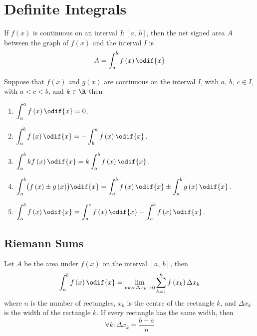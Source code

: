 \documentclass{article}
\begin{document}
\section{Definite Integrals}
\begin{theorem}
    If \(f\left( x \right)\) is continuous on an interval \(I:\left[ a,\:b \right]\),
    then the net signed area \(A\) between the graph of \(f\left( x \right)\) and the
    interval \(I\) is
    \begin{equation*}
        A = \int_a^b f\left( x \right) \odif{x}
    \end{equation*}
\end{theorem}
\begin{tcolorboxlarge}[title={Properties of Definite Integrals}]
    \begin{theorem}
        Suppose that \(f\left( x \right)\) and \(g\left( x \right)\) are continuous on the
        interval \(I\), with \(a,\:b,\:c\in I\), with \(a < c < b\), and
        \(k\in\R\) then
        \begin{enumerate}[label=\normalfont\alph*)]
            \item \(\displaystyle\int_a^a f\left( x \right) \odif{x} = 0\).
            \item \(\displaystyle\int_a^b f\left( x \right) \odif{x} = -\int_b^a f\left( x \right) \odif{x}\).
            \item \(\displaystyle\int_a^b kf\left( x \right) \odif{x} = k\int_a^b f\left( x \right) \odif{x}\).
            \item \(\displaystyle\int_a^b \bigl(f\left( x \right) \pm g\left( x \right)\bigr) \odif{x} = \int_a^b f\left( x \right) \odif{x} \pm \int_a^b g\left( x \right) \odif{x}\).
            \item \(\displaystyle\int_a^b f\left( x \right) \odif{x} = \int_a^c f\left( x \right) \odif{x} + \int_c^b f\left( x \right) \odif{x}\).
        \end{enumerate}
    \end{theorem}
\end{tcolorboxlarge}
\subsection{Riemann Sums}
\begin{theorem}
    \label{theorem:1d_riemann_sums}
    Let \(A\) be the area under \(f\left( x \right)\) on the interval
    \(\left[ a,\:b \right]\), then
    \begin{equation*}
        \int_a^b f\left( x \right) \odif{x} = \lim_{\max{\Delta x_k}\to 0} \sum_{k=1}^n f\left( x_k \right) \Delta x_k
    \end{equation*}
    where \(n\) is the number of rectangles, \(x_k\) is the centre of
    the rectangle \(k\), and \(\Delta x_k\) is the width of the
    rectangle \(k\). If every rectangle has the same width, then
    \begin{equation*}
        \forall k:\Delta x_k = \frac{b-a}{n}
    \end{equation*}
\end{theorem}
\end{document}

